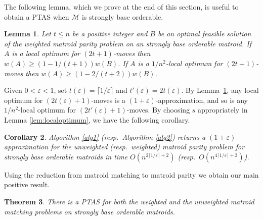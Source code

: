\documentclass[letterpaper,11pt]{article}
\newcommand{\M}{\mathcal{M}}
\newtheorem{theorem}{Theorem}[section]
\newtheorem{corollary}[theorem]{Corollary}
\newtheorem{lemma}[theorem]{Lemma}
\theoremstyle{definition}
\begin{document}
The following lemma, which we prove at the end of this section, is useful to obtain a PTAS when $\M$ is strongly base orderable.

\begin{lemma}\label{lem:main}
Let $t\leq n$ be a positive integer and $B$ be an optimal feasible solution of the weighted matroid parity problem on an strongly base orderable matroid.
If $A$ is a local optimum for $(2t+1)$-moves then $w(A) \geq \left(1-1/(t+1)\right)w(B)$.
If $A$ is a $1/n^2$-local optimum for $(2t+1)$-moves then $w(A) \geq \left(1-2/(t+2)\right)w(B)$.
\end{lemma}

Given $0< \varepsilon < 1$, set $t(\varepsilon)=\lceil 1/\varepsilon\rceil$ and $t'(\varepsilon)=2t(\varepsilon)$. By Lemma~\ref{lem:main}, any local optimum for $(2t(\varepsilon)+1)$-moves is a $(1 + \varepsilon)$-approximation, and so is any $1/n^2$-local optimum for $(2t'(\varepsilon)+1)$-moves. By choosing $s$ appropriately in Lemma \ref{lem:localoptimum}, we have the following corollary.

\begin{corollary} Algorithm \ref{alg1} (resp.\ Algorithm \ref{alg2}) returns a $(1+\varepsilon)$-approximation for the unweighted (resp.\ weighted) matroid parity problem for strongly base orderable matroids in time $O(n^{2\lceil1/\varepsilon\rceil+2})$ (resp.\ $O(n^{4\lceil 1/\varepsilon\rceil+3})$).
\end{corollary}

Using the reduction from matroid matching to matroid parity we obtain our main positive result.
\begin{theorem} There is a PTAS for both the weighted and the unweighted matroid matching problems on strongly base orderable matroids.
\end{theorem}
\end{document}
